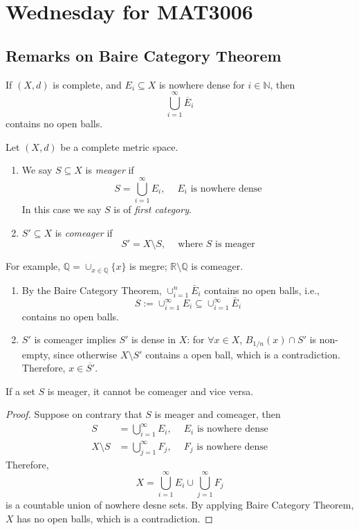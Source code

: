 \section{Wednesday for MAT3006}
\subsection{Remarks on Baire Category Theorem}
\begin{theorem}
If $(X,d)$ is complete, and $E_i\subseteq X$ is nowhere dense for $i\in\mathbb{N}$, then
\[
\bigcup_{i=1}^\infty\overline{E}_i
\]
contains no open balls.
\end{theorem}


\begin{definition}
Let $(X,d)$ be a complete metric space. 
\begin{enumerate}
\item
We say $S\subseteq X$ is \emph{meager} if 
\[
S=\bigcup_{i=1}^\infty E_i,\ \quad\text{$E_i$ is nowhere dense}
\]
In this case we say $S$ is of \emph{first category}.
\item
$S'\subseteq X$ is \emph{comeager} if
\[
S'=X\setminus S, \ \quad\text{where $S$ is meager}
\]
\end{enumerate}
\end{definition}
For example, $\mathbb{Q} = \cup_{x\in\mathbb{Q}}\{x\}$ is megre; $\mathbb{R}\setminus\mathbb{Q}$ is comeager.
\begin{remark}
\begin{enumerate}
\item
By the Baire Category Theorem, $\cup_{i=1}^n\bar{E}_i$ contains no open balls, i.e.,
\[
S:=\cup_{i=1}^\infty{E}_i\subseteq \cup_{i=1}^\infty\bar{E}_i
\]
contains no open balls.
\item
$S'$ is comeager implies $S'$ is dense in $X$: for $\forall x\in X$, $B_{1/n}(x)\cap S'$ is non-empty, since otherwise $X\setminus S'$ contains a open ball, which is a contradiction. Therefore, $x\in\overline{S'}$.
\end{enumerate}
\end{remark}



\begin{proposition}
If a set $S$ is meager, it cannot be comeager and vice versa.
\end{proposition}

\begin{proof}
Suppose on contrary that $S$ is meager and comeager, then
\begin{align*}
S&=\bigcup_{i=1}^\infty E_i,\ \quad\text{$E_i$ is nowhere dense}\\
X\setminus S&=\bigcup_{j=1}^\infty F_j, \ \quad\text{$F_j$ is nowhere dense}
\end{align*}
Therefore, 
\[
X = \bigcup_{i=1}^\infty E_i\cup\bigcup_{j=1}^\infty F_j
\]
is a countable union of nowhere desne sets. By applying Baire Category Theorem, $X$ has no open balls, which is a contradiction.
\end{proof}

